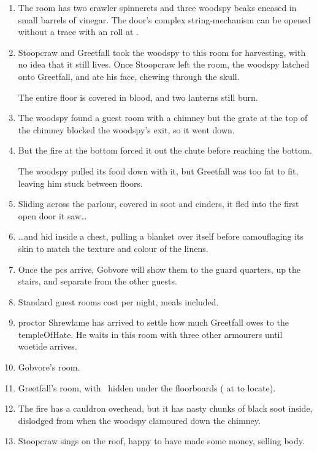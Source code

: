 \documentclass[10pt,twoside]{book}
\begin{document}
\begin{enumerate}\itemsep0em
  \item
  The room has two \gls{crawler} spinnerets and three \gls{woodspy} beaks encased in small barrels of vinegar.
  \label{lt:ingStore}
  The door's complex string-mechanism can be opened without a trace with an  roll at \tn[9].
  \item
  Stoopcraw and Greetfall took the \gls{woodspy} to this room for \gls{harvesting}, with no idea that it still lives.
  Once Stoopcraw left the room, the \gls{woodspy} latched onto Greetfall, and ate his face, chewing through the skull.

  The entire floor is covered in blood, and two lanterns still burn.
  \label{lt:cutting}
  \item
  The \gls{woodspy} found a guest room with a chimney but the grate at the top of the chimney blocked the \gls{woodspy}'s exit, so it went down.
  \label{lt:guestFire}
  \item
  But the fire at the bottom forced it out the chute before reaching the bottom.

  The \gls{woodspy} pulled its food down with it, but Greetfall was too fat to fit, leaving him stuck between floors.
  \label{lt:chimney}
  \item
  Sliding across the parlour, covered in soot and cinders, it fled into the first open door it saw\ldots
  \label{lt:parlour}
  \item
  \ldots and hid inside a chest, pulling a blanket over itself before camouflaging its skin to match the texture and colour of the linens.
  \label{lt:woodspy}
  \item
  Once the \glspl{pc} arrive, Gobvore will show them to the \gls{guard} quarters, up the stairs, and separate from the other guests.
  \label{lt:guard}
  \item
  Standard guest rooms cost  per night, meals included.
  \label{lt:guests}
  \item
  \Gls{proctor} Shrewlame has arrived to settle how much Greetfall owes to the \gls{templeOfHate}.
  He waits in this room with three other \glspl{armourer} until \gls{woetide} arrives.
  \label{lt:proctor}
  \item
  Gobvore's room.
  \label{lt:server}
  \item
  Greetfall's room, with \lootBig\ hidden under the floorboards ( at \tn[10] to locate).
  \label{lt:tenderRoom}
  \item
  The fire has a cauldron overhead, but it has nasty chunks of black soot inside, dislodged from when the \gls{woodspy} clamoured down the chimney.
  \label{lt:fire}
  \item
  Stoopcraw sings on the roof, happy to have made some money, selling  body.
  \label{lt:singer}
\end{enumerate}
\end{document}
